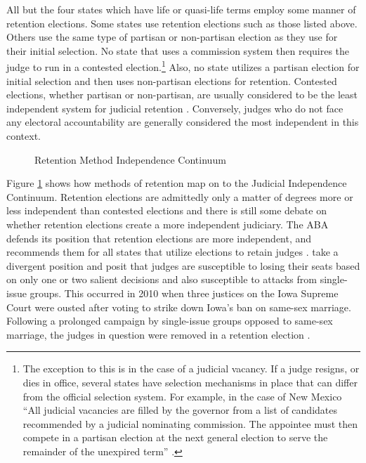 \documentclass[12pt]{article}
\begin{document}
All but the four states which have life or quasi-life terms employ some manner of retention elections. Some states use retention elections such as those listed above. Others use the same type of partisan or non-partisan election as they use for their initial selection. No state that uses a commission system then requires the judge to run in a contested election.\footnote{The exception to this is in the case of a judicial vacancy.  If a judge resigns, or dies in office, several states have selection mechanisms in place that can differ from the official selection system.  For example, in the case of New Mexico ``All judicial vacancies are filled by the governor from a list of candidates recommended by a judicial nominating commission. The appointee must then compete in a partisan election at the next general election to serve the remainder of the unexpired term'' \citep{AJS}.}  Also, no state utilizes a partisan election for initial selection and then uses non-partisan elections for retention.  Contested elections, whether partisan or non-partisan, are usually considered to be the least independent system for judicial retention \citep{Choi2010,ABA2003,Canes-Wrone2012}. Conversely, judges who do not face any electoral accountability are generally considered the most independent in this context.

\begin{figure}[tbh]\centering\caption{Retention Method Independence Continuum}\label{retentioncontinuum}
\end{figure}

Figure \ref{retentioncontinuum} shows how methods of retention map on to the Judicial Independence Continuum.  Retention elections are admittedly only a matter of degrees more or less independent than contested elections and there is still some debate on whether retention elections create a more independent judiciary. The ABA defends its position that retention elections are more independent, and recommends them for all states that utilize elections to retain judges \citep{ABA2003}.  \citet{Canes-Wrone2012} take a divergent position and posit that judges are susceptible to losing their seats based on only one or two salient decisions and also susceptible to attacks from single-issue groups.  This occurred in 2010 when three justices on the Iowa Supreme Court were ousted after voting to strike down Iowa's ban on same-sex marriage. Following a prolonged campaign by single-issue groups opposed to same-sex marriage, the judges in question were removed in a retention election \citep{Iowa2010}.
\end{document}
